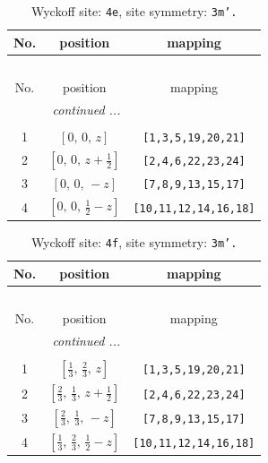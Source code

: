 \documentclass[fleqn,8pt]{jsarticle}
\begin{document}
\begin{longtable}{ccc}
\caption{Wyckoff site: {\tt 4e}, site symmetry: {\tt 3m'.}}
 \\
 \hline \hline
No. & position & mapping \\ \hline \endfirsthead

\multicolumn{2}{l}{\tablename\ \thetable{}} \\
 \hline \hline
No. & position & mapping \\ \hline \endhead

 \hline \hline
\multicolumn{2}{r}{\footnotesize\it continued ...} \\ \endfoot

 \hline \hline
\multicolumn{2}{r}{} \\ \endlastfoot

1 & $\left[ 0,\, 0,\, z \right]$ & {\tt [1,3,5,19,20,21]} \\ \hline
2 & $\left[ 0,\, 0,\, z + \frac{1}{2} \right]$ & {\tt [2,4,6,22,23,24]} \\ \hline
3 & $\left[ 0,\, 0,\, - z \right]$ & {\tt [7,8,9,13,15,17]} \\ \hline
4 & $\left[ 0,\, 0,\, \frac{1}{2} - z \right]$ & {\tt [10,11,12,14,16,18]} \\
\end{longtable}
\renewcommand{\arraystretch}{1.2}
\begin{longtable}{ccc}
\caption{Wyckoff site: {\tt 4f}, site symmetry: {\tt 3m'.}}
 \\
 \hline \hline
No. & position & mapping \\ \hline \endfirsthead

\multicolumn{2}{l}{\tablename\ \thetable{}} \\
 \hline \hline
No. & position & mapping \\ \hline \endhead

 \hline \hline
\multicolumn{2}{r}{\footnotesize\it continued ...} \\ \endfoot

 \hline \hline
\multicolumn{2}{r}{} \\ \endlastfoot

1 & $\left[ \frac{1}{3},\, \frac{2}{3},\, z \right]$ & {\tt [1,3,5,19,20,21]} \\ \hline
2 & $\left[ \frac{2}{3},\, \frac{1}{3},\, z + \frac{1}{2} \right]$ & {\tt [2,4,6,22,23,24]} \\ \hline
3 & $\left[ \frac{2}{3},\, \frac{1}{3},\, - z \right]$ & {\tt [7,8,9,13,15,17]} \\ \hline
4 & $\left[ \frac{1}{3},\, \frac{2}{3},\, \frac{1}{2} - z \right]$ & {\tt [10,11,12,14,16,18]} \\
\end{longtable}
\end{document}

